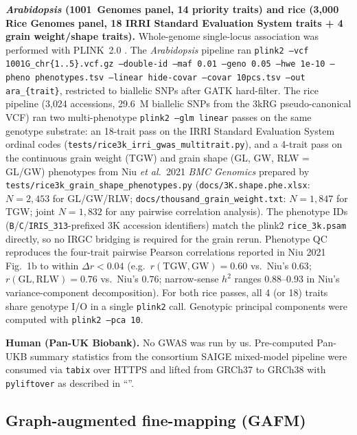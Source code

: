 \textbf{\emph{Arabidopsis} (1001~Genomes panel, 14 priority
traits) and rice (3{,}000 Rice Genomes panel, 18 IRRI Standard
Evaluation System traits + 4 grain weight/shape traits).}
Whole-genome single-locus association was performed with
PLINK~2.0 \cite{chang2015second}. The \emph{Arabidopsis}
pipeline ran
\texttt{plink2 --vcf 1001G\_chr\{1..5\}.vcf.gz --double-id
--maf 0.01 --geno 0.05 --hwe 1e-10 --pheno phenotypes.tsv
--linear hide-covar --covar 10pcs.tsv --out
ara\_\{trait\}}, restricted to biallelic SNPs after GATK
hard-filter. The rice pipeline (3{,}024 accessions, 29.6~M
biallelic SNPs from the 3kRG pseudo-canonical VCF) ran two
multi-phenotype \texttt{plink2 --glm linear} passes on the same
genotype substrate: an 18-trait pass on the IRRI Standard
Evaluation System ordinal codes
(\texttt{tests/rice3k\_irri\_gwas\_multitrait.py}), and a
4-trait pass on the continuous grain weight (TGW) and grain
shape (GL, GW, RLW = GL/GW) phenotypes from Niu \emph{et al.}\
2021 \emph{BMC Genomics} \cite{niu2021grain} prepared by
\texttt{tests/rice3k\_grain\_shape\_phenotypes.py}
(\texttt{docs/3K.shape.phe.xlsx}: $N=2{,}453$ for GL/GW/RLW;
\texttt{docs/thousand\_grain\_weight.txt}: $N=1{,}847$ for TGW;
joint $N=1{,}832$ for any pairwise correlation analysis).
The phenotype IDs (\texttt{B}/\texttt{C}/\texttt{IRIS\_313}-prefixed
3K accession identifiers) match the plink2 \texttt{rice\_3k.psam}
directly, so no IRGC bridging is required for the grain rerun.
Phenotype QC reproduces the four-trait pairwise Pearson
correlations reported in Niu 2021 Fig.~1b to within $\Delta r <
0.04$ (e.g.\ $r(\mathrm{TGW},\mathrm{GW}){=}0.60$ vs.\ Niu's $0.63$;
$r(\mathrm{GL},\mathrm{RLW}){=}0.76$ vs.\ Niu's $0.76$;
narrow-sense $h^2$ ranges 0.88--0.93 in Niu's variance-component
decomposition). For both rice passes, all 4 (or 18) traits share
genotype I/O in a single \texttt{plink2} call. Genotypic
principal components were computed with \texttt{plink2 --pca 10}.

\textbf{Human (Pan-UK Biobank).} No GWAS was run by us.
Pre-computed Pan-UKB summary statistics from the consortium SAIGE
mixed-model pipeline\cite{karczewski2024pan,bycroft2018uk} were
consumed via \texttt{tabix}\cite{li2011tabix} over HTTPS and
lifted from GRCh37 to GRCh38 with
\texttt{pyliftover} as described in
``''.

\subsection*{Graph-augmented fine-mapping (GAFM)}\label{methods:gafm}

